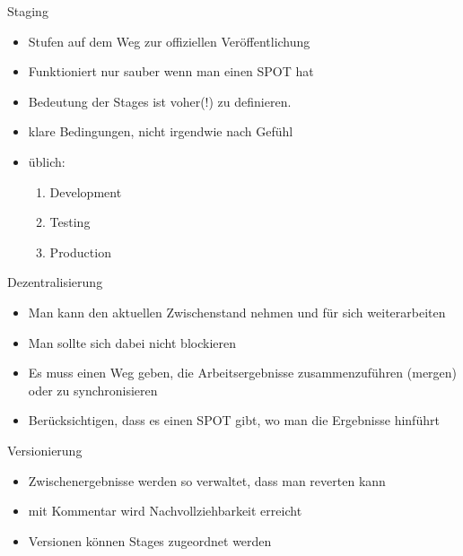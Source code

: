 \documentclass{beamer}
\begin{document}
\begin{frame}
	\begin{block}{Staging}
		\begin{itemize}
			\item Stufen auf dem Weg zur offiziellen Veröffentlichung
			\item Funktioniert nur sauber wenn man einen SPOT hat
			\item Bedeutung der Stages ist voher(!) zu definieren.
			\item klare Bedingungen, nicht irgendwie nach Gefühl
			\item üblich:
			\begin{enumerate}
				\item Development
				\item Testing
				\item Production
			\end{enumerate}


		\end{itemize}
	\end{block}
\end{frame}

\begin{frame}
	\begin{block}{Dezentralisierung}
		\begin{itemize}
			\item Man kann den aktuellen Zwischenstand nehmen und für sich weiterarbeiten
			\item Man sollte sich dabei nicht blockieren
			\item Es muss einen Weg geben, die Arbeitsergebnisse zusammenzuführen (mergen) oder zu synchronisieren
			\item Berücksichtigen, dass es einen SPOT gibt, wo man die Ergebnisse hinführt
		\end{itemize}
	\end{block}
\end{frame}

\begin{frame}
	\begin{block}{Versionierung}
		\begin{itemize}
			\item Zwischenergebnisse werden so verwaltet, dass man reverten kann
			\item mit Kommentar wird Nachvollziehbarkeit erreicht
			\item Versionen können Stages zugeordnet werden
		\end{itemize}
	\end{block}
\end{frame}
\end{document}
